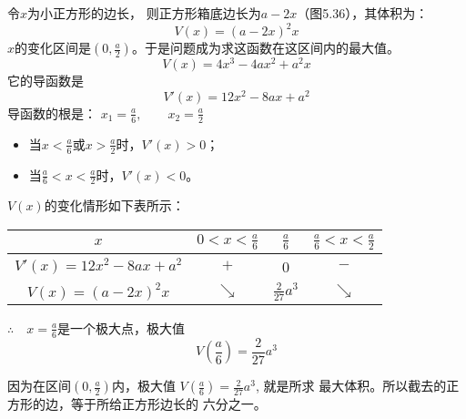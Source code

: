 \begin{figure}[htp]
    \centering

    \caption{}
\end{figure}

\begin{solution}
令$x$为小正方形的边长，
则正方形箱底边长为$a-2x$（图5.36），其体积为：
\[V(x)=(a-2x)^2x\]
$x$的变化区间是$\left(0,\frac{a}{2}\right)$。于是问题成为求这函数在这区间内的最大值。   
\[V(x)=4x^3-4ax^2+a^2x\]
它的导函数是
\[V'(x)=12x^2-8ax+a^2\]
导函数的根是：
$x_1=\frac{a}{6},\qquad x_2=\frac{a}{2}$

\begin{itemize}
    \item 当$x<\frac{a}{6}$或$x>\frac{a}{2}$时，$V'(x)>0$；
    \item 当$\frac{a}{6}<x<\frac{a}{2}$时，$V'(x)<0$。
\end{itemize}
$V(x)$的变化情形如下表所示：
\begin{center}
    \begin{tabular}{c|ccc}
\hline
$x$ & $0<x<\tfrac{a}{6}$&$\tfrac{a}{6}$& $\tfrac{a}{6}<x<\tfrac{a}{2}$\\
\hline
$V'(x)=12x^2-8ax+a^2$ & $+$ &0 &$-$\\
$V(x)=(a-2x)^2x$ &  $\searrow$& $\tfrac{2}{27}a^3$& $\searrow$\\
\hline
    \end{tabular}
\end{center}
$\therefore\quad x=\frac{a}{6}$是一个极大点，极大值
\[V\left(\frac{a}{6}\right)=\frac{2}{27}a^3\]

因为在区间$\left(0,\frac{a}{2}\right)$内，极大值
$V\left(\frac{a}{6}\right)=\frac{2}{27}a^3$, 就是所求
最大体积。所以截去的正方形的边，等于所给正方形边长的
六分之一。
\end{solution}


